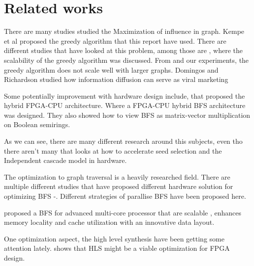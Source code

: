 \chapter{Related works}
There are many studies studied the Maximization of influence in graph\cite{MaximizeSpread2003}.  Kempe et al proposed the greedy algorithm that this report have used. There are different studies that have looked at this problem, among those are \cite{InfluenceMax}, where the scalability of the greedy algorithm was discussed. From \cite{InfluenceMax} and our experiments, the greedy algorithm does not scale well with larger graphs. Domingos and Richardson studied how information diffusion can serve as viral marketing\cite{ViralMarketing}

Some potentially improvement with hardware design include\cite{HybridBFS2015}, that proposed the hybrid FPGA-CPU architecture. Where a FPGA-CPU hybrid BFS architecture was designed. They also showed how to view BFS as matrix-vector multiplication on Boolean semirings. 

As we can see, there are many different research around this subjects, even tho there aren't many that looks at how to accelerate seed selection and the Independent cascade model in hardware.

The optimization to graph traversal is a heavily researched field. There are multiple different studies that have proposed different hardware solution for optimizing BFS \cite{ScalableGraphEx}-\cite{DirectOptimizeBFS}. Different strategies of parallise BFS have been proposed here\cite{ParallelBFS2011}. 

\cite{ScalableGraphEx} proposed a BFS for advanced multi-core processor that are scalable , enhances memory locality and cache utilization with an innovative data layout.

One optimization aspect, the high level synthesis have been getting some attention lately.\cite{HLSready2015} shows that HLS might be a viable optimization for FPGA design. 